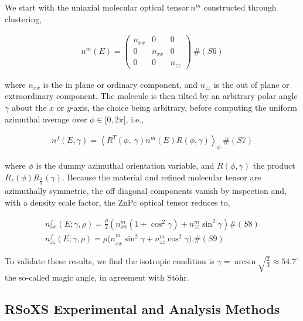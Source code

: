 We start with the uniaxial molecular optical tensor\({\ n}^{m}\) constructed through clustering,

\[\begin{array}{r}
n^{m}(E) = \begin{pmatrix}
n_{xx} & 0 & 0 \\
0 & n_{xx} & 0 \\
0 & 0 & n_{zz}
\end{pmatrix}\ \#(S6)
\end{array}\]

where \(n_{xx}\) is the in plane or ordinary component, and \(n_{zz}\) is the out of plane or extraordinary component. The molecule is then tilted by an arbitrary polar angle \(\gamma\) about the \(x\) or \(y\)-axis, the choice being arbitrary, before computing the uniform azimuthal average over \(\phi \in \lbrack 0,2\pi\rbrack\), i.e.,

\[\begin{array}{r}
n^{f}(E,\gamma) = \left\langle R^{T}(\phi,\ \gamma)n^{m}(E)R(\phi,\gamma) \right\rangle_{\phi}\ \#(S7)
\end{array}\]

where \(\phi\) is the dummy azimuthal orientation variable, and \(R(\phi,\gamma)\) the product \(R_{z}(\phi)R_{\frac{x}{y}}(\gamma)\). Because the material and refined molecular tensor are azimuthally symmetric, the off diagonal components vanish by inspection and, with a density scale factor, the ZnPc optical tensor reduces to,

\[\begin{array}{r}
n_{xx}^{f}(E;\gamma,\rho) = \frac{\rho}{2}\left( n_{xx}^{m}\left( 1 + \cos^{2}\gamma \right) + n_{zz}^{m}\sin^{2}\gamma \right)\#(S8) \\
n_{zz}^{f}(E;\gamma,\rho) = {\rho(n}_{xx}^{m}\sin^{2}{\gamma + n_{zz}^{m}\cos^{2}{\gamma)}}.\#(S9)
\end{array}\]

To validate these results, we find the isotropic condition is \(\gamma = \arcsin\sqrt{\frac{2}{3}} \approx {54.7}^{\circ}\) the so-called magic angle, in agreement with Stöhr.\autocite{stohr2010nexafs}

\subsection{RSoXS Experimental and Analysis Methods}\label{rsoxs-experimental-and-analysis-methods}

